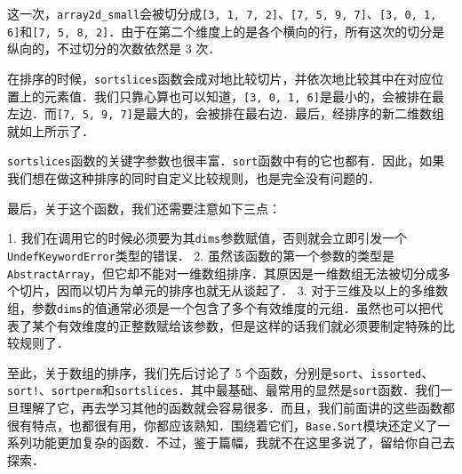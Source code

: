 这一次，\verb|array2d_small|会被切分成\verb|[3, 1, 7, 2]|、\verb|[7, 5, 9, 7]|、\verb|[3, 0, 1, 6]|和\verb|[7, 5, 8, 2]|．由于在第二个维度上的是各个横向的行，所有这次的切分是纵向的，不过切分的次数依然是 3 次．

在排序的时候，\verb|sortslices|函数会成对地比较切片，并依次地比较其中在对应位置上的元素值．我们只靠心算也可以知道，\verb|[3, 0, 1, 6]|是最小的，会被排在最左边．而\verb|[7, 5, 9, 7]|是最大的，会被排在最右边．最后，经排序的新二维数组就如上所示了．

\verb|sortslices|函数的关键字参数也很丰富．\verb|sort|函数中有的它也都有．因此，如果我们想在做这种排序的同时自定义比较规则，也是完全没有问题的．

最后，关于这个函数，我们还需要注意如下三点：

1. 我们在调用它的时候必须要为其\verb|dims|参数赋值，否则就会立即引发一个\verb|UndefKeywordError|类型的错误．
2. 虽然该函数的第一个参数的类型是\verb|AbstractArray|，但它却不能对一维数组排序．其原因是一维数组无法被切分成多个切片，因而以切片为单元的排序也就无从谈起了．
3. 对于三维及以上的多维数组，参数\verb|dims|的值通常必须是一个包含了多个有效维度的元组．虽然也可以把代表了某个有效维度的正整数赋给该参数，但是这样的话我们就必须要制定特殊的比较规则了．

至此，关于数组的排序，我们先后讨论了 5 个函数，分别是\verb|sort|、\verb|issorted|、\verb|sort!|、\verb|sortperm|和\verb|sortslices|．其中最基础、最常用的显然是\verb|sort|函数．我们一旦理解了它，再去学习其他的函数就会容易很多．而且，我们前面讲的这些函数都很有特点，也都很有用，你都应该熟知．围绕着它们，\verb|Base.Sort|模块还定义了一系列功能更加复杂的函数．不过，鉴于篇幅，我就不在这里多说了，留给你自己去探索．